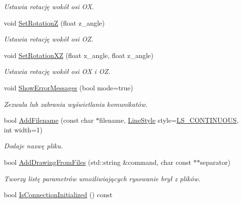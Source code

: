 \begin{DoxyCompactItemize}
\begin{DoxyCompactList}\small\item\em Ustawia rotację wokół osi {\itshape OX}. \end{DoxyCompactList}\item 
void \hyperlink{class_pz_g_1_1_gnuplot_link_a2d72e30d46e7fb61fbf70f2ea5c0d0a5}{Set\+RotationZ} (float z\+\_\+angle)
\begin{DoxyCompactList}\small\item\em Ustawia rotację wokół osi {\itshape OZ}. \end{DoxyCompactList}\item 
void \hyperlink{class_pz_g_1_1_gnuplot_link_ae1019984feb2a9cef9c8b41eec65ee97}{Set\+Rotation\+XZ} (float x\+\_\+angle, float z\+\_\+angle)
\begin{DoxyCompactList}\small\item\em Ustawia rotację wokół osi {\itshape OX} i {\itshape OZ}. \end{DoxyCompactList}\item 
void \hyperlink{class_pz_g_1_1_gnuplot_link_a9c8f23498ce784bd4f62583163e9c065}{Show\+Error\+Messages} (bool mode=true)
\begin{DoxyCompactList}\small\item\em Zezwala lub zabrania wyświetlania komunikatów. \end{DoxyCompactList}\item 
bool \hyperlink{class_pz_g_1_1_gnuplot_link_a795ee974694d79694496e09d668eb562}{Add\+Filename} (const char $\ast$filename, \hyperlink{namespace_pz_g_ab0580cdb6bfe9e51d7de2588bc824076}{Line\+Style} style=\hyperlink{namespace_pz_g_ab0580cdb6bfe9e51d7de2588bc824076af8f97c84dadf8eaa1f0370861e15dfec}{L\+S\+\_\+\+C\+O\+N\+T\+I\+N\+U\+O\+US}, int width=1)
\begin{DoxyCompactList}\small\item\em Dodaje nazwę pliku. \end{DoxyCompactList}\item 
bool \hyperlink{class_pz_g_1_1_gnuplot_link_a8f6eb81e4b1324d338a13de9fe692583}{Add\+Drawing\+From\+Files} (std\+::string \&command, char const $\ast$$\ast$separator)
\begin{DoxyCompactList}\small\item\em Tworzy listę parametrów umożliwiających rysowanie brył z plików. \end{DoxyCompactList}\item 
bool \hyperlink{class_pz_g_1_1_gnuplot_link_a515a61833bc59ed29e7fafab3ca93918}{Is\+Connection\+Initialized} () const 
$$
\end{DoxyCompactItemize}
